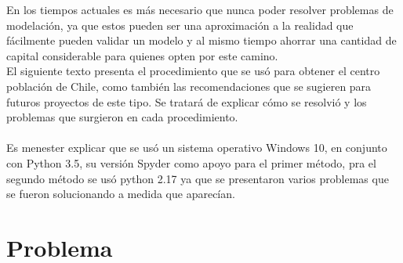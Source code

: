 \documentclass[20pt]{report}
\begin{document}
En los tiempos actuales es m\'as  necesario  que nunca poder resolver problemas de modelaci\'on, ya que estos pueden  ser una aproximaci\'on a la realidad que f\'acilmente pueden validar un modelo y al mismo tiempo ahorrar una cantidad de capital considerable para quienes opten por este camino. 
\\
El siguiente texto presenta  el procedimiento que se us\'o para obtener el centro poblaci\'on de Chile, como tambi\'en las recomendaciones que se sugieren para futuros proyectos de este tipo. Se tratar\'a de explicar c\'omo se resolvi\'o y los problemas que surgieron en cada procedimiento.\\
\\
Es menester explicar que se us\'o un sistema operativo Windows 10, en conjunto con Python 3.5, su versi\'on Spyder como apoyo para el primer m\'etodo, pra el segundo m\'etodo se us\'o python 2.17 ya que se presentaron varios problemas que se fueron solucionando a medida que aparec\'ian.

\pagebreak



\chapter{Problema }\label{cap.introduccion}
\end{document}
